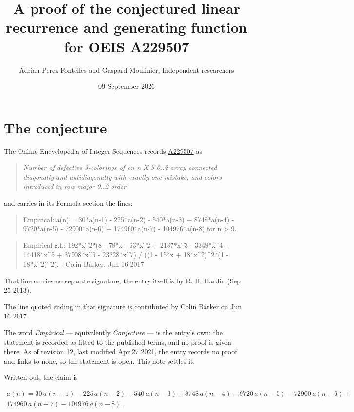 \documentclass[11pt]{article}
\title{A proof of the conjectured linear recurrence and generating function for OEIS A229507}
\author{Adrian Perez Fontelles and Gaspard Moulinier, Independent researchers}
\date{09 September 2026}
\theoremstyle{definition}
\begin{document}
\maketitle
\section{The conjecture}

The Online Encyclopedia of Integer Sequences records \href{https://oeis.org/A229507}{A229507} as

\begin{quote}\itshape Number of defective 3-colorings of an n X 5 0..2 array connected diagonally and antidiagonally with exactly one mistake, and colors introduced in row-major 0..2 order\end{quote}

and carries in its Formula section the lines:

\begin{quote}\ttfamily Empirical: a(n) = 30*a(n-1) - 225*a(n-2) - 540*a(n-3) + 8748*a(n-4) - 9720*a(n-5) - 72900*a(n-6) + 174960*a(n-7) - 104976*a(n-8) for n > 9.\end{quote}

\begin{quote}\ttfamily Empirical g.f.: 192*x\textasciicircum{}2*(8 - 78*x - 63*x\textasciicircum{}2 + 2187*x\textasciicircum{}3 - 3348*x\textasciicircum{}4 - 14418*x\textasciicircum{}5 + 37908*x\textasciicircum{}6 - 23328*x\textasciicircum{}7) / ((1 - 15*x + 18*x\textasciicircum{}2)\textasciicircum{}2*(1 - 18*x\textasciicircum{}2)\textasciicircum{}2). - Colin Barker, Jun 16 2017\end{quote}

That line carries no separate signature; the entry itself is by R. H. Hardin (Sep 25 2013).

The line quoted ending in that signature is contributed by Colin Barker on Jun 16 2017.

The word {\itshape Empirical} --- equivalently {\itshape Conjecture} --- is the entry's own: the statement is recorded as fitted to the published terms, and no proof is given there. As of revision 12, last modified Apr 27 2021, the entry records no proof and links to none, so the statement is open. This note settles it.

Written out, the claim is

\begin{multline*} a(n) = 30\,a(n-1) - 225\,a(n-2) - 540\,a(n-3) + 8748\,a(n-4) - 9720\,a(n-5) - 72900\,a(n-6) + \\ 174960\,a(n-7) - 104976\,a(n-8). \end{multline*}
\end{document}
